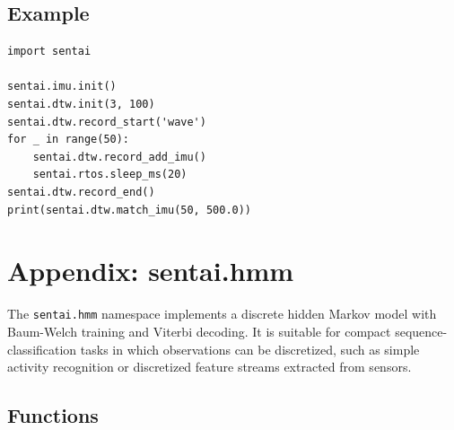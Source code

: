 \subsection{Example}\label{example-19}

\begin{verbatim}
import sentai

sentai.imu.init()
sentai.dtw.init(3, 100)
sentai.dtw.record_start('wave')
for _ in range(50):
    sentai.dtw.record_add_imu()
    sentai.rtos.sleep_ms(20)
sentai.dtw.record_end()
print(sentai.dtw.match_imu(50, 500.0))
\end{verbatim}

\section{Appendix: sentai.hmm}\label{appendix-sentai.hmm}

The \texttt{sentai.hmm} namespace implements a discrete hidden Markov
model with Baum-Welch training and Viterbi decoding. It is suitable for
compact sequence-classification tasks in which observations can be
discretized, such as simple activity recognition or discretized feature
streams extracted from sensors.

\subsection{Functions}\label{functions-20}


